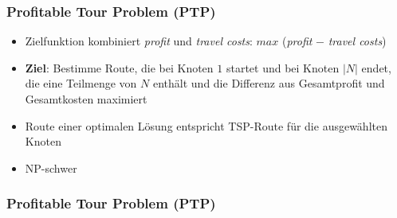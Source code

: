 \documentclass{beamer}
\begin{document}
\begin{frame}
\frametitle{Profitable Tour Problem (\textsc{PTP})}
\begin{itemize}
  \item Zielfunktion kombiniert \textit{profit} und \textit{travel costs}:\newline
  $max$ (\textit{profit} $-$ \textit{travel costs})
  \item \textbf{Ziel}: Bestimme Route, die bei Knoten $1$ startet und bei Knoten $|N|$ endet, die eine Teilmenge von $N$
  enthält und die Differenz aus Gesamtprofit und Gesamtkosten maximiert
  \item Route einer optimalen Lösung entspricht \textsc{TSP}-Route für die ausgewählten Knoten
  \item NP-schwer
\end{itemize}
\end{frame}

\begin{frame}
  \frametitle{Profitable Tour Problem (\textsc{PTP})}
\end{frame}
\end{document}
